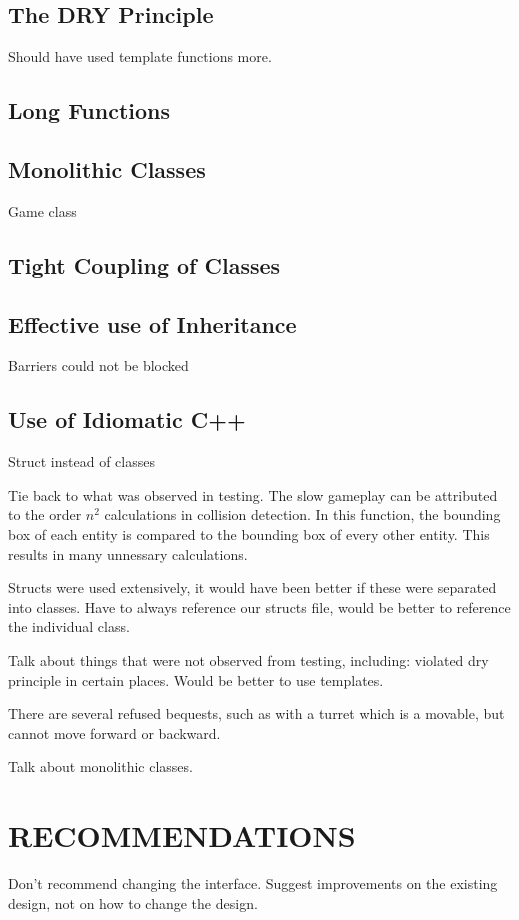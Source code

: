 \documentclass[10pt,twocolumn]{witseiepaper}
\begin{document}
\subsection{The DRY Principle}
Should have used template functions more.

\subsection{Long Functions}

\subsection{Monolithic Classes}
Game class

\subsection{Tight Coupling of Classes}

\subsection{Effective use of Inheritance}
Barriers could not be blocked

\subsection{Use of Idiomatic C++}
Struct instead of classes

Tie back to what was observed in testing. The slow gameplay can be attributed to the order $ n^{2} $ calculations in collision detection. In this function, the bounding box of each entity is compared to the bounding box of every other entity. This results in many unnessary calculations.

Structs were used extensively, it would have been better if these were separated into classes. Have to always reference our structs file, would be better to reference the individual class. 

Talk about things that were not observed from testing, including: violated dry principle in certain places. Would be better to use templates.

There are several refused bequests, such as with a turret which is a movable, but cannot move forward or backward.

Talk about monolithic classes.

%
\section{RECOMMENDATIONS} %
Don't recommend changing the interface. Suggest improvements on the existing design, not on how to change the design.
\end{document}
